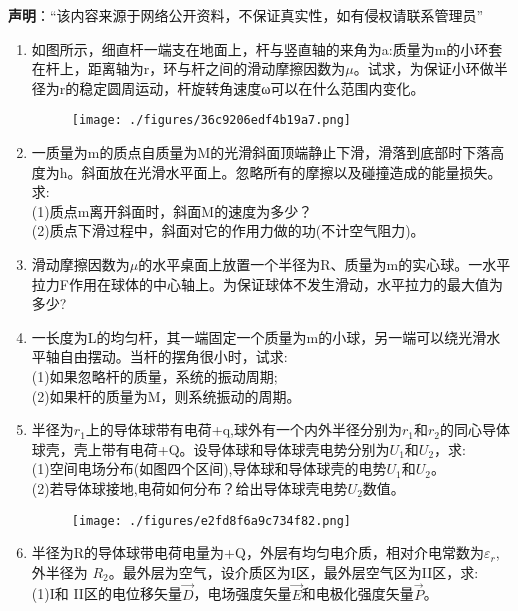 
\textbf{声明}：“该内容来源于网络公开资料，不保证真实性，如有侵权请联系管理员”

\begin{enumerate}
\item 如图所示，细直杆一端支在地面上，杆与竖直轴的来角为a:质量为m的小环套在杆上，距离轴为r，环与杆之间的滑动摩擦因数为$\mu$。试求，为保证小环做半径为r的稳定圆周运动，杆旋转角速度ω可以在什么范围内变化。
\begin{figure}[ht]
\centering
\texttt{[image: ./figures/36c9206edf4b19a7.png]}
\caption{} \label{fig_SSD11_1}
\end{figure}
\item 一质量为m的质点自质量为M的光滑斜面顶端静止下滑，滑落到底部时下落高度为h。斜面放在光滑水平面上。忽略所有的摩擦以及碰撞造成的能量损失。求:\\
(1)质点m离开斜面时，斜面M的速度为多少？\\
(2)质点下滑过程中，斜面对它的作用力做的功(不计空气阻力)。
\item 滑动摩擦因数为$\mu$的水平桌面上放置一个半径为R、质量为m的实心球。一水平拉力F作用在球体的中心轴上。为保证球体不发生滑动，水平拉力的最大值为多少?
\item 一长度为L的均匀杆，其一端固定一个质量为m的小球，另一端可以绕光滑水平轴自由摆动。当杆的摆角很小时，试求:\\
(1)如果忽略杆的质量，系统的振动周期;\\
(2)如果杆的质量为M，则系统振动的周期。
\item 半径为$r_1$上的导体球带有电荷+q,球外有一个内外半径分别为$r_1$和$r_2$的同心导体球壳，壳上带有电荷+Q。设导体球和导体球壳电势分别为$U_1$和$U_2$，求:\\
(1)空间电场分布(如图四个区间),导体球和导体球壳的电势$U_1$和$U_2$。\\
(2)若导体球接地,电荷如何分布？给出导体球壳电势$U_2$数值。
\begin{figure}[ht]
\centering
\texttt{[image: ./figures/e2fd8f6a9c734f82.png]}
\caption{} \label{fig_SSD11_2}
\end{figure}
\item 半径为R的导体球带电荷电量为+Q，外层有均匀电介质，相对介电常数为$\varepsilon_r$,外半径为 $R_2$。最外层为空气，设介质区为I区，最外层空气区为II区，求:\\
(1)I和 II区的电位移矢量$\vec D$，电场强度矢量$\vec E$和电极化强度矢量$\vec P$。\\

\end{enumerate}
